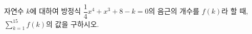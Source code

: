 자연수 $k$에 대하여 방정식 $\dfrac{1}{4}x^4+x^3+8-k=0$의 음근의 개수를 $f(k)$라 할 때, $\displaystyle\sum_{k=1}^{15}f(k)$의 값을 구하시오.
